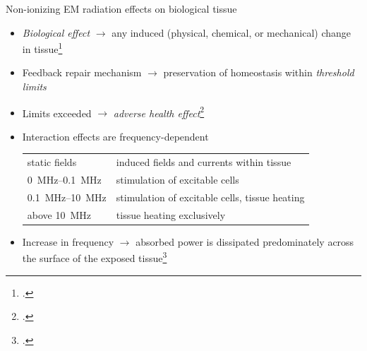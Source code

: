 \documentclass[xcolor=dvipsnames,10pt]{beamer}
\begin{document}
\begin{frame}{Non-ionizing EM radiation effects
on biological tissue}
    \begin{itemize}
        \item \emph{Biological effect} $\rightarrow$ any induced (physical, chemical, or mechanical) change in tissue\footcite{ICNIRP2020Principles}
        \item Feedback repair mechanism $\rightarrow$ preservation of homeostasis within \emph{threshold limits}
        \item Limits exceeded $\rightarrow$ \emph{adverse health effect}\footcite{WHO2022Health}
        \item Interaction effects are frequency-dependent
        \begin{tabular}{p{2.7cm}p{8cm}}
            static fields & induced fields and currents within tissue\\
            \SIrange{0}{0.1}{\MHz} & stimulation of excitable cells\\
            \SIrange{0.1}{10}{\MHz} & stimulation of excitable cells, tissue heating\\
            above \SI{10}{\MHz} & tissue heating exclusively
        \end{tabular}
        \item Increase in frequency $\rightarrow$ absorbed power is dissipated predominately across the surface of the exposed tissue\footcite{Ziskin2018Tissue}
        \end{itemize}
\end{frame}
\end{document}
